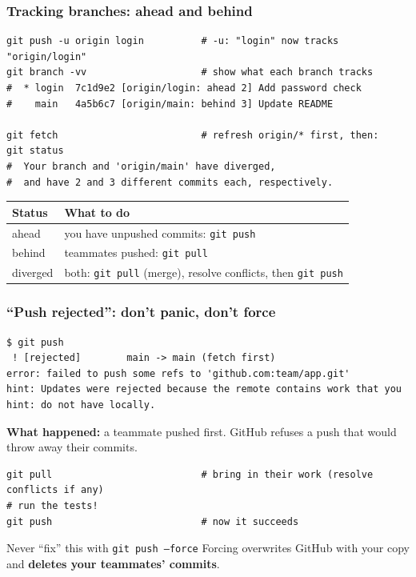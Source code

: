 \documentclass[aspectratio=169,10pt,compress]{beamer}
\newcommand{\cmd}[1]{\texttt{\color{gitred}#1}}
\begin{document}
\begin{frame}[t,fragile] \frametitle{Tracking branches: ahead and behind}
\begin{lstlisting}
git push -u origin login          # -u: "login" now tracks "origin/login"
git branch -vv                    # show what each branch tracks
#  * login  7c1d9e2 [origin/login: ahead 2] Add password check
#    main   4a5b6c7 [origin/main: behind 3] Update README

git fetch                         # refresh origin/* first, then:
git status
#  Your branch and 'origin/main' have diverged,
#  and have 2 and 3 different commits each, respectively.
\end{lstlisting}

  \small
  \begin{tabular}{@{}L{0.25\textwidth}L{0.65\textwidth}@{}}
    \toprule
    \textbf{Status} & \textbf{What to do} \\
    \midrule
    ahead      & you have unpushed commits: \cmd{git push} \\
    behind     & teammates pushed: \cmd{git pull} \\
    diverged   & both: \cmd{git pull} (merge), resolve conflicts, then \cmd{git push} \\
    \bottomrule
  \end{tabular}
\end{frame}

\begin{frame}[t,fragile] \frametitle{``Push rejected'': don't panic, don't force}
\begin{lstlisting}[language={}]
$ git push
 ! [rejected]        main -> main (fetch first)
error: failed to push some refs to 'github.com:team/app.git'
hint: Updates were rejected because the remote contains work that you
hint: do not have locally.
\end{lstlisting}

  \textbf{What happened:} a teammate pushed first. GitHub refuses a push that would
  throw away their commits.

\begin{lstlisting}
git pull                          # bring in their work (resolve conflicts if any)
# run the tests!
git push                          # now it succeeds
\end{lstlisting}

  \begin{alertblock}{Never ``fix'' this with \texttt{git push --force}}
    Forcing overwrites GitHub with your copy and \textbf{deletes your teammates' commits}.
  \end{alertblock}
\end{frame}
\end{document}
